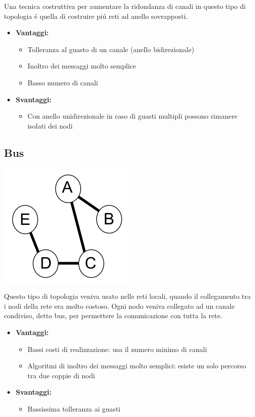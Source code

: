 \documentclass[12pt]{article}
\begin{document}
Una tecnica costruttiva per aumentare la ridondanza di canali in questo tipo di topologia \'e quella di costruire pi\'u reti 
ad anello sovrapposti.
\begin{itemize}[noitemsep]
	\item \textbf{Vantaggi:}
	\begin{itemize}[noitemsep]
		\item Tolleranza al guasto di un canale (anello bidirezionale)
		\item Inoltro dei messaggi molto semplice
		\item Basso numero di canali
	\end{itemize}
	\item \textbf{Svantaggi:}
	\begin{itemize}[noitemsep]
		\item Con anello unidirezionale in caso di guasti multipli possono rimanere isolati dei nodi
	\end{itemize}
\end{itemize}

\subsection{Bus}\label{bus}
\begin{center}
	\includegraphics[scale=0.5]{introduzione-img9.png}
\end{center}
Questo tipo di topologia veniva usato nelle reti locali, quando il collegamento tra i nodi della rete era molto costoso.
Ogni nodo veniva collegato ad un canale condiviso, detto bus, per permettere la comunicazione con tutta la rete.
\begin{itemize}[noitemsep]
	\item \textbf{Vantaggi:}
	\begin{itemize}[noitemsep]
		\item Bassi costi di realizzazione: usa il numero minimo di canali
		\item Algoritmi di inoltro dei messaggi molto semplici: esiste un solo percorso tra due coppie di nodi
	\end{itemize}
	\item \textbf{Svantaggi:}
	\begin{itemize}[noitemsep]
		\item Bassissima tolleranza ai guasti
	\end{itemize}
\end{itemize}
\end{document}
